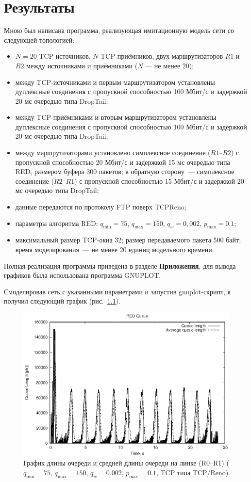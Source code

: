 \chapter{Результаты}

Мною был написана программа, реализующая имитационную модель сети со следующей топологией:
\begin{itemize}
\item $N=20$ TCP-источников, $N$ TCP-приёмников, двух маршрутизаторов $R1$
  и $R2$ между источниками и приёмниками ($N$ — не менее 20);
\item между TCP-источниками и первым маршрутизатором установлены
  дуплексные соединения с пропускной способностью 100 Мбит/с и
  задержкой 20 мс очередью типа DropTail;
\item между TCP-приёмниками и вторым маршрутизатором установлены
  дуплексные соединения с пропускной способностью 100 Мбит/с и
  задержкой 20 мс очередью типа DropTail;
\item между маршрутизаторами установлено симплексное соединение
  ($R1$--$R2$) с пропускной способностью 20 Мбит/с и задержкой 15 мс
  очередью типа RED, размером буфера 300 пакетов; в обратную сторону~---
  симплексное соединение ($R2$--$R1$) с пропускной способностью 15 Мбит/с и
  задержкой 20 мс очередью типа DropTail;
\item данные передаются по протоколу FTP поверх TCPReno;
\item параметры алгоритма RED: $q_{\min}=75$, $q_{\max}=150$, $q_w=0,002$, $p_{\max}=0.1$;
\item максимальный размер TCP-окна 32; размер передаваемого пакета 500
  байт; время моделирования~--- не менее 20 единиц модельного времени.
\end{itemize}

Полная реализация программы приведена в разделе \textbf{Приложения},
для вывода графиков была использована программа GNUPLOT.

Смоделировав сеть с указанными параметрами и запустив gnuplot-скрипт,
я получил следующий график (рис.~\ref{fig:3.1}).

\begin{figure}[!ht]
  \centering
  \includegraphics[width=0.6\linewidth]{image/queues_75-150_classic.eps}
  \caption{График длины очереди и средней длины очереди на
    линке (R0--R1) ($q_{\min}=75$, $q_{\max}=150$, $q_w=0.002$, $p_{\max}=0.1$,
    TCP типа TCP/Reno)}
  \label{fig:3.1}
\end{figure}

